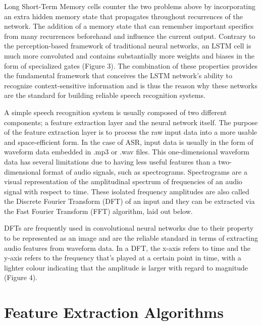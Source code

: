 Long Short-Term Memory cells counter the two problems above by incorporating an extra hidden memory state that propagates throughout recurrences of the network. The addition of a memory state that can remember important specifics from many recurrences beforehand and influence the current output. Contrary to the perception-based framework of traditional neural networks, an LSTM cell is much more convoluted and contains substantially more weights and biases in the form of specialized gates (Figure 3). The combination of these properties provides the fundamental framework that conceives the LSTM network’s ability to recognize context-sensitive information and is thus the reason why these networks are the standard for building reliable speech recognition systems. 
\par
A simple speech recognition system is usually composed of two different components; a feature extraction layer and the neural network itself. The purpose of the feature extraction layer is to process the raw input data into a more usable and space-efficient form. In the case of ASR, input data is usually in the form of waveform data embedded in .mp3 or .wav files. This one-dimensional waveform data has several limitations due to having less useful features than a two-dimensional format of audio signals, such as spectrograms. Spectrograms are a visual representation of the amplitudinal spectrum of frequencies of an audio signal with respect to time. These isolated frequency amplitudes are also called the Discrete Fourier Transform (DFT) of an input and they can be extracted via the Fast Fourier Transform (FFT) algorithm, laid out below.
\par
DFTs are frequently used in convolutional neural networks due to their property to be represented as an image and are the reliable standard in terms of extracting audio features from waveform data. In a DFT, the x-axis refers to time and the y-axis refers to the frequency that’s played at a certain point in time, with a lighter colour indicating that the amplitude is larger with regard to magnitude (Figure 4). 

\section{Feature Extraction Algorithms}


